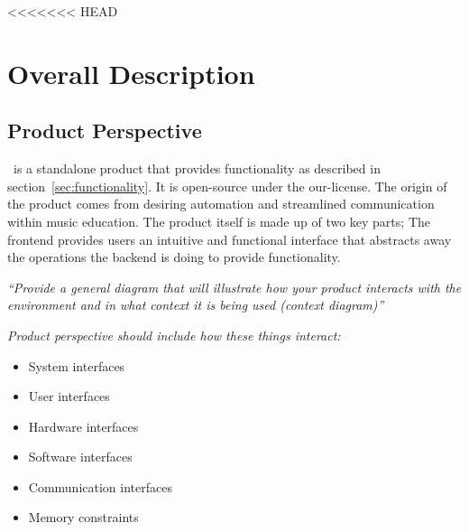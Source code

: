 
<<<<<<< HEAD
\section{Overall Description}\label{sec:overall-description}
    \subsection{Product Perspective}\label{sec:product-perspective}
        \projectName\ is a standalone product that provides functionality as described in section~\ref{sec:functionality}. It is \gls{open-source} under the \gls{our-license}. The origin of the product comes from desiring automation and streamlined communication within music education. The product itself is made up of two key parts; The frontend provides users an intuitive and functional interface that abstracts away the operations the backend is doing to provide functionality.
        \par\emph{\todo ``Provide a general diagram that will illustrate how your product interacts with the environment and in what context it is being used (context diagram)''}
        \par\emph{Product perspective should include how these things interact: \cite{srs-bmc}}
        \begin{itemize}
            \item System interfaces
            \item User interfaces
            \item Hardware interfaces
            \item Software interfaces
            \item Communication interfaces
            \item Memory constraints
        \end{itemize}
